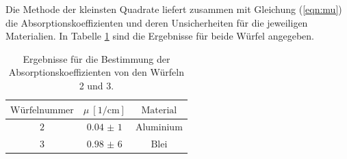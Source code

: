 \FloatBarrier
\noindent Die Methode der kleinsten Quadrate liefert zusammen mit Gleichung (\ref{eqn:mu}) die Absorptionskoeffizienten und deren Unsicherheiten für die jeweiligen Materialien.
In Tabelle \ref{tab:tabalu} sind die Ergebnisse für beide Würfel angegeben.
\begin{table}
  \centering
  \caption{Ergebnisse für die Bestimmung der Absorptionskoeffizienten von den Würfeln 2 und 3.}
  \label{tab:tabalu}
  \begin{tabular}{c c c}
    \toprule
		$\mathrm{Würfelnummer}$ & $\mu \: [\si{1\per\centi\meter}]$ & $\mathrm{Material}$ \\
    \midrule
		$\num{2}$ & $\num{0,04(1)}$ & $\mathrm{Aluminium}$\\
		$\num{3}$ & $\num{0,98(6)}$ & $\mathrm{Blei}$ \\
    \bottomrule
  \end{tabular}
\end{table}
\FloatBarrier
